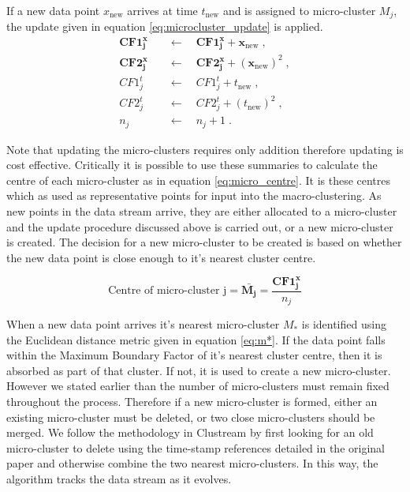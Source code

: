 If a new data point $x_{\text{new}}$ arrives at time $t_{\text{new}}$ and is assigned to micro-cluster $M_j$, the  update  given in equation \eqref{eq:microcluster_update} is applied. 
\begin{align}
\boldsymbol{CF1^x_j} \quad &\leftarrow \quad \boldsymbol{CF1^x_j} + \boldsymbol{x}_{\text{new}} \; , \nonumber  \\ 
\boldsymbol{CF2^x_j} \quad &\leftarrow \quad \boldsymbol{CF2^x_j} + (\boldsymbol{x}_{\text{new}})^2 \; , \nonumber\\
CF1^t_j \quad &\leftarrow \quad  CF1^t_j + t_{\text{new}} \; , \nonumber   \\
CF2^t_j \quad &\leftarrow \quad CF2^t_j + (t_{\text{new}})^2 \; , \nonumber\\
n_j  \quad &\leftarrow \quad n_j + 1 \; .
\label{eq:microcluster_update}
\end{align}

Note that updating the micro-clusters requires only addition therefore updating is cost effective. Critically it is possible to use these summaries to calculate the centre of each micro-cluster as in equation \eqref{eq:micro_centre}. It is these centres which as used as representative points for input into the macro-clustering.  As new points in the data stream arrive, they are either allocated to a micro-cluster and the update procedure discussed above is carried out, or a new micro-cluster is created. The decision for a new micro-cluster to be created is based on whether the new data point is close enough to it's nearest cluster centre. 

\begin{equation}
  \label{eq:micro_centre}
  \text{Centre of micro-cluster j}  = \boldsymbol{\bar{M_j}} = \frac{\boldsymbol{CF1^x_j}}{n_j}
\end{equation}

When a new data point arrives it's nearest micro-cluster $M_{*}$ is identified using the Euclidean distance metric given in equation \eqref{eq:m*}. If the data point falls within the Maximum Boundary Factor of it's nearest cluster centre, then it is absorbed as part of that cluster. If not, it is used to create a new micro-cluster. However we stated earlier than the number of micro-clusters must remain fixed throughout the process. Therefore if a new micro-cluster is formed, either an existing  micro-cluster must be deleted, or two close micro-clusters should be merged. We follow the methodology in Clustream by first looking for an old micro-cluster to delete using the time-stamp references detailed in the original paper and otherwise combine the two nearest micro-clusters. In this way, the algorithm tracks the data stream as it evolves. 

